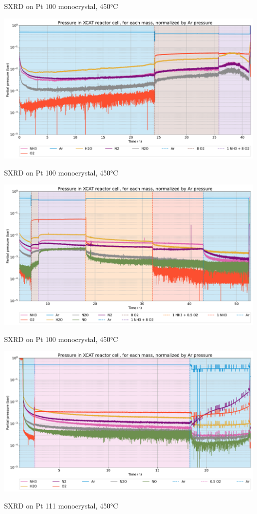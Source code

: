 \begin{frame}{SXRD on Pt 100 monocrystal, 450°C}

	\includegraphics[width=0.99\textwidth]{Figures/gas_analysis/SXRD/Pt100/exp_before_heater_change_carrier.pdf}

\end{frame}

\begin{frame}{SXRD on Pt 100 monocrystal, 450°C}

	\includegraphics[width=0.99\textwidth]{Figures/gas_analysis/SXRD/Pt100/exp_cycle_carrier.pdf}

\end{frame}

\begin{frame}{SXRD on Pt 100 monocrystal, 450°C}

	\includegraphics[width=0.99\textwidth]{Figures/gas_analysis/SXRD/Pt100/exp_cond_g_carrier.pdf}

\end{frame}

\begin{frame}{SXRD on Pt 111 monocrystal, 450°C}


\end{frame}